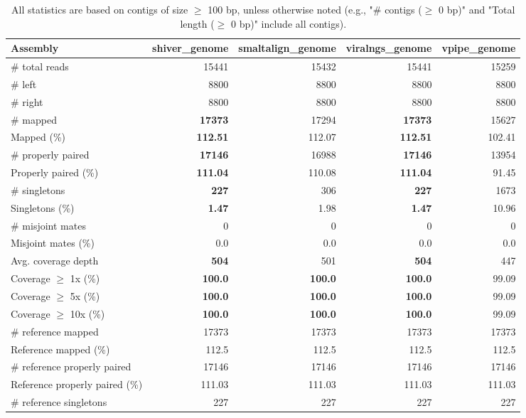\documentclass[12pt,a4paper]{article}
\begin{document}
\begin{table}[ht]
\begin{center}
\caption{All statistics are based on contigs of size $\geq$ 100 bp, unless otherwise noted (e.g., "\# contigs ($\geq$ 0 bp)" and "Total length ($\geq$ 0 bp)" include all contigs).}
\begin{tabular}{|l*{4}{|r}|}
\hline
Assembly & shiver\_genome & smaltalign\_genome & viralngs\_genome & vpipe\_genome \\ \hline
\# total reads & 15441 & 15432 & 15441 & 15259 \\ \hline
\# left & 8800 & 8800 & 8800 & 8800 \\ \hline
\# right & 8800 & 8800 & 8800 & 8800 \\ \hline
\# mapped & {\bf 17373} & 17294 & {\bf 17373} & 15627 \\ \hline
Mapped (\%) & {\bf 112.51} & 112.07 & {\bf 112.51} & 102.41 \\ \hline
\# properly paired & {\bf 17146} & 16988 & {\bf 17146} & 13954 \\ \hline
Properly paired (\%) & {\bf 111.04} & 110.08 & {\bf 111.04} & 91.45 \\ \hline
\# singletons & {\bf 227} & 306 & {\bf 227} & 1673 \\ \hline
Singletons (\%) & {\bf 1.47} & 1.98 & {\bf 1.47} & 10.96 \\ \hline
\# misjoint mates & 0 & 0 & 0 & 0 \\ \hline
Misjoint mates (\%) & 0.0 & 0.0 & 0.0 & 0.0 \\ \hline
Avg. coverage depth & {\bf 504} & 501 & {\bf 504} & 447 \\ \hline
Coverage $\geq$ 1x (\%) & {\bf 100.0} & {\bf 100.0} & {\bf 100.0} & 99.09 \\ \hline
Coverage $\geq$ 5x (\%) & {\bf 100.0} & {\bf 100.0} & {\bf 100.0} & 99.09 \\ \hline
Coverage $\geq$ 10x (\%) & {\bf 100.0} & {\bf 100.0} & {\bf 100.0} & 99.09 \\ \hline
\# reference mapped & 17373 & 17373 & 17373 & 17373 \\ \hline
Reference mapped (\%) & 112.5 & 112.5 & 112.5 & 112.5 \\ \hline
\# reference properly paired & 17146 & 17146 & 17146 & 17146 \\ \hline
Reference properly paired (\%) & 111.03 & 111.03 & 111.03 & 111.03 \\ \hline
\# reference singletons & 227 & 227 & 227 & 227 \\ \hline

\end{tabular}
\end{center}
\end{table}
\end{document}
